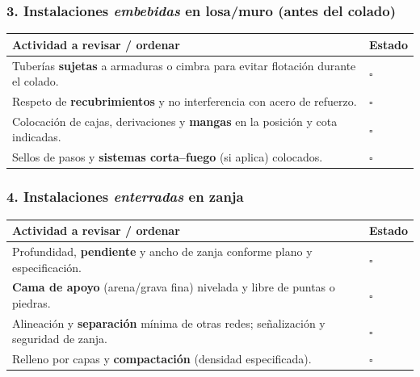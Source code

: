 \documentclass[12pt]{article}
\newcommand{\cbox}{\(\square\)}
\renewcommand{\cbox}{\(\square\)} %
\begin{document}
	\subsubsection*{3. Instalaciones \textit{embebidas} en losa/muro (antes del colado)}
	\begin{tabularx}{\linewidth}{>{\raggedright\arraybackslash}p{0.93\linewidth} >{\centering\arraybackslash}m{0.07\linewidth}}
		\toprule
		\textbf{Actividad a revisar / ordenar} & \textbf{Estado}\\
		\midrule
		Tuberías \textbf{sujetas} a armaduras o cimbra para evitar flotación durante el colado. & \cbox \\
		Respeto de \textbf{recubrimientos} y no interferencia con acero de refuerzo. & \cbox \\
		Colocación de cajas, derivaciones y \textbf{mangas} en la posición y cota indicadas. & \cbox \\
		Sellos de pasos y \textbf{sistemas corta–fuego} (si aplica) colocados. & \cbox \\
		\bottomrule
	\end{tabularx}
	
	\subsubsection*{4. Instalaciones \textit{enterradas} en zanja}
	\begin{tabularx}{\linewidth}{>{\raggedright\arraybackslash}p{0.93\linewidth} >{\centering\arraybackslash}m{0.07\linewidth}}
		\toprule
		\textbf{Actividad a revisar / ordenar} & \textbf{Estado}\\
		\midrule
		Profundidad, \textbf{pendiente} y ancho de zanja conforme plano y especificación. & \cbox \\
		\textbf{Cama de apoyo} (arena/grava fina) nivelada y libre de puntas o piedras. & \cbox \\
		Alineación y \textbf{separación} mínima de otras redes; señalización y seguridad de zanja. & \cbox \\
		Relleno por capas y \textbf{compactación} (densidad especificada). & \cbox \\
		\bottomrule
	\end{tabularx}
	
\end{document}
